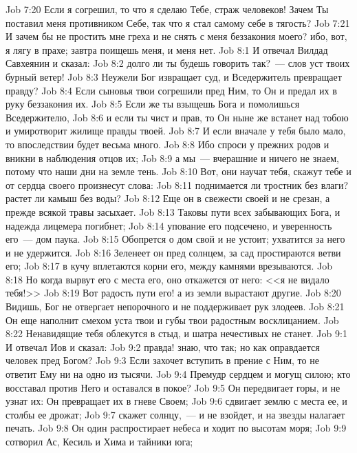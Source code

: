 \vs Job 7:20 Если я согрешил, то что я сделаю Тебе, страж человеков! Зачем Ты поставил меня противником Себе, так что я стал самому себе в тягость?
\vs Job 7:21 И зачем бы не простить мне греха и не снять с меня беззакония моего? ибо, вот, я лягу в прахе; завтра поищешь меня, и меня нет.
\vs Job 8:1 И отвечал Вилдад Савхеянин и сказал:
\vs Job 8:2 долго ли ты будешь говорить так?~--- слов уст твоих бурный ветер!
\vs Job 8:3 Неужели Бог извращает суд, и Вседержитель превращает правду?
\vs Job 8:4 Если сыновья твои согрешили пред Ним, то Он и предал их в руку беззакония их.
\vs Job 8:5 Если же ты взыщешь Бога и помолишься Вседержителю,
\vs Job 8:6 и если ты чист и прав, то Он ныне же встанет над тобою и умиротворит жилище правды твоей.
\vs Job 8:7 И если вначале у тебя было мало, то впоследствии будет весьма много.
\vs Job 8:8 Ибо спроси у прежних родов и вникни в наблюдения отцов их;
\vs Job 8:9 а мы~--- вчерашние и ничего не знаем, потому что наши дни на земле тень.
\vs Job 8:10 Вот, они научат тебя, скажут тебе и от сердца своего произнесут слова:
\vs Job 8:11 поднимается ли тростник без влаги? растет ли камыш без воды?
\vs Job 8:12 Еще он в свежести своей и не срезан, а прежде всякой травы засыхает.
\vs Job 8:13 Таковы пути всех забывающих Бога, и надежда лицемера погибнет;
\vs Job 8:14 упование его подсечено, и уверенность его~--- дом паука.
\vs Job 8:15 Обопрется о дом свой и не устоит; ухватится за него и не удержится.
\vs Job 8:16 Зеленеет он пред солнцем, за сад простираются ветви его;
\vs Job 8:17 в кучу  вплетаются корни его, между камнями врезываются.
\vs Job 8:18 Но когда вырвут его с места его, оно откажется от него: <<я не видало тебя!>>
\vs Job 8:19 Вот радость пути его! а из земли вырастают другие.
\vs Job 8:20 Видишь, Бог не отвергает непорочного и не поддерживает рук злодеев.
\vs Job 8:21 Он еще наполнит смехом уста твои и губы твои радостным восклицанием.
\vs Job 8:22 Ненавидящие тебя облекутся в стыд, и шатра нечестивых не станет.
\vs Job 9:1 И отвечал Иов и сказал:
\vs Job 9:2 правда! знаю, что так; но как оправдается человек пред Богом?
\vs Job 9:3 Если захочет вступить в прение с Ним, то не ответит Ему ни на одно из тысячи.
\vs Job 9:4 Премудр сердцем и могущ силою; кто восставал против Него и оставался в покое?
\vs Job 9:5 Он передвигает горы, и не узнат их: Он превращает их в гневе Своем;
\vs Job 9:6 сдвигает землю с места ее, и столбы ее дрожат;
\vs Job 9:7 скажет солнцу,~--- и не взойдет, и на звезды налагает печать.
\vs Job 9:8 Он один распростирает небеса и ходит по высотам моря;
\vs Job 9:9 сотворил Ас, Кесиль и Хима и тайники юга;
